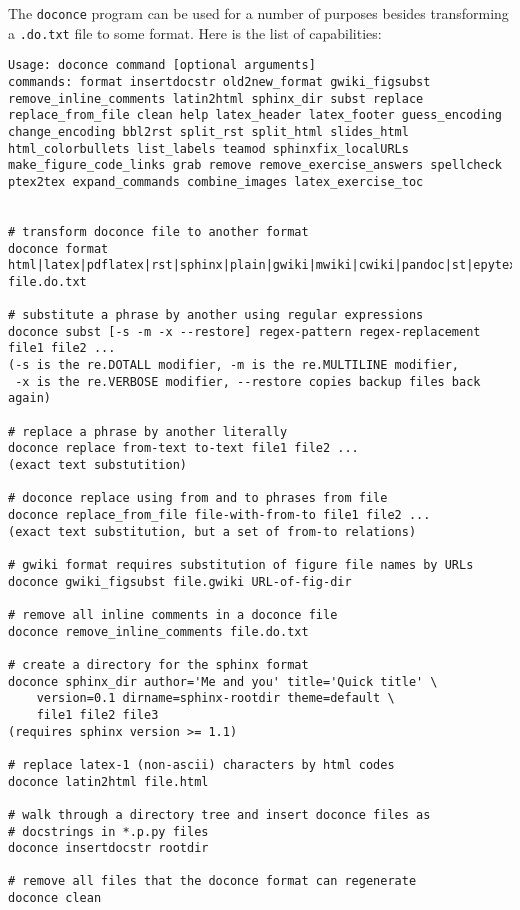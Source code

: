 \documentclass[twoside]{article}
\begin{document}
The {\fontsize{10pt}{10pt}\verb!doconce!} program can be used for a number of purposes besides
transforming a {\fontsize{10pt}{10pt}\verb!.do.txt!} file to some format. Here is the
list of capabilities:

\begin{Verbatim}
Usage: doconce command [optional arguments]
commands: format insertdocstr old2new_format gwiki_figsubst remove_inline_comments latin2html sphinx_dir subst replace replace_from_file clean help latex_header latex_footer guess_encoding change_encoding bbl2rst split_rst split_html slides_html html_colorbullets list_labels teamod sphinxfix_localURLs make_figure_code_links grab remove remove_exercise_answers spellcheck ptex2tex expand_commands combine_images latex_exercise_toc


# transform doconce file to another format
doconce format html|latex|pdflatex|rst|sphinx|plain|gwiki|mwiki|cwiki|pandoc|st|epytext file.do.txt

# substitute a phrase by another using regular expressions
doconce subst [-s -m -x --restore] regex-pattern regex-replacement file1 file2 ...
(-s is the re.DOTALL modifier, -m is the re.MULTILINE modifier,
 -x is the re.VERBOSE modifier, --restore copies backup files back again)

# replace a phrase by another literally
doconce replace from-text to-text file1 file2 ...
(exact text substutition)

# doconce replace using from and to phrases from file
doconce replace_from_file file-with-from-to file1 file2 ...
(exact text substitution, but a set of from-to relations)

# gwiki format requires substitution of figure file names by URLs
doconce gwiki_figsubst file.gwiki URL-of-fig-dir

# remove all inline comments in a doconce file
doconce remove_inline_comments file.do.txt

# create a directory for the sphinx format
doconce sphinx_dir author='Me and you' title='Quick title' \
    version=0.1 dirname=sphinx-rootdir theme=default \
    file1 file2 file3
(requires sphinx version >= 1.1)

# replace latex-1 (non-ascii) characters by html codes
doconce latin2html file.html

# walk through a directory tree and insert doconce files as
# docstrings in *.p.py files
doconce insertdocstr rootdir

# remove all files that the doconce format can regenerate
doconce clean


\end{Verbatim}
\end{document}
